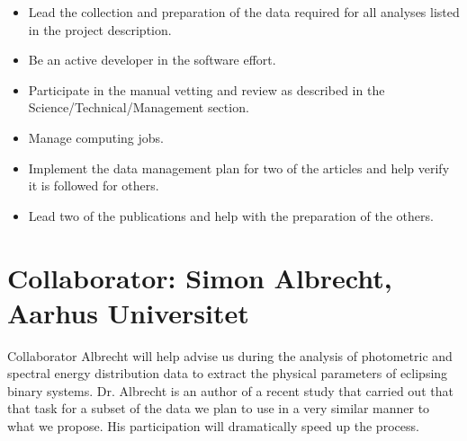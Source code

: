\begin{itemize}
%
    \item Lead the collection and preparation of the data required for all
        analyses listed in the project description.
%
    \item Be an active developer in the software effort.
%
    \item Participate in the manual vetting and review as described in the
        Science/Technical/Management section.
%
    \item Manage computing jobs.
%
    \item Implement the data management plan for two of the articles and help
        verify it is followed for others.
%
    \item Lead two of the publications and help with the preparation of the
        others.
%
\end{itemize}

\vspace{5mm}

\section*{Collaborator: Simon Albrecht, Aarhus Universitet}

Collaborator Albrecht will help advise us during the analysis of photometric and
spectral energy distribution data to extract the physical parameters of
eclipsing binary systems. Dr. Albrecht is an author of a recent study that
carried out that that task for a subset of the data we plan to use in a very
similar manner to what we propose. His participation will dramatically speed up
the process.
